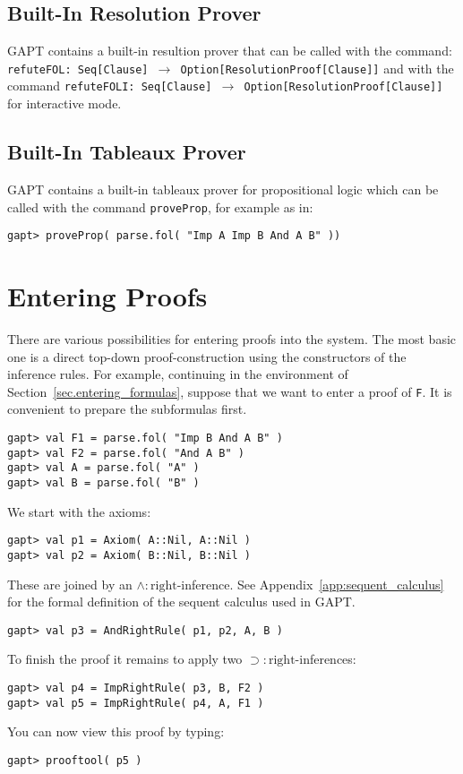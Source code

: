 \documentclass[a4paper,11pt]{article}
\newcommand{\impl}{\supset} %
\renewcommand{\land}{\wedge}
\begin{document}
\subsection{Built-In Resolution Prover}

GAPT contains a built-in resultion prover that can be called with the command:
\texttt{refuteFOL: Seq[Clause] $\rightarrow$ Option[ResolutionProof[Clause]]}
and with the command
\texttt{refuteFOLI: Seq[Clause] $\rightarrow$ Option[ResolutionProof[Clause]]}
for interactive mode.

\subsection{Built-In Tableaux Prover}

GAPT contains a  built-in tableaux prover for propositional logic
which can be called with the command \texttt{proveProp}, for example as in:
\begin{lstlisting}
gapt> proveProp( parse.fol( "Imp A Imp B And A B" ))
\end{lstlisting}

\section{Entering Proofs}\label{sec:entering_proofs}

There are various possibilities for entering proofs into the system. The most
basic one is a direct top-down proof-construction using the constructors
of the inference rules. For example, continuing in the environment of
Section~\ref{sec.entering_formulas}, suppose that we want to enter a
proof of \texttt{F}. It is convenient to prepare the subformulas first.
\begin{lstlisting}
gapt> val F1 = parse.fol( "Imp B And A B" )
gapt> val F2 = parse.fol( "And A B" )
gapt> val A = parse.fol( "A" )
gapt> val B = parse.fol( "B" )
\end{lstlisting}
%
We start with the axioms:
%
\begin{lstlisting}
gapt> val p1 = Axiom( A::Nil, A::Nil )
gapt> val p2 = Axiom( B::Nil, B::Nil )
\end{lstlisting}
%
These are joined by an $\land:\mathrm{right}$-inference. See Appendix~\ref{app:sequent_calculus}
for the formal definition of the sequent calculus used in GAPT.
%
\begin{lstlisting}
gapt> val p3 = AndRightRule( p1, p2, A, B )
\end{lstlisting}
%
To finish the proof it remains to apply two $\impl:\mathrm{right}$-inferences:
%
\begin{lstlisting}
gapt> val p4 = ImpRightRule( p3, B, F2 )
gapt> val p5 = ImpRightRule( p4, A, F1 )
\end{lstlisting}
%
You can now view this proof by typing:
\begin{lstlisting}
gapt> prooftool( p5 )
\end{lstlisting}
\end{document}
